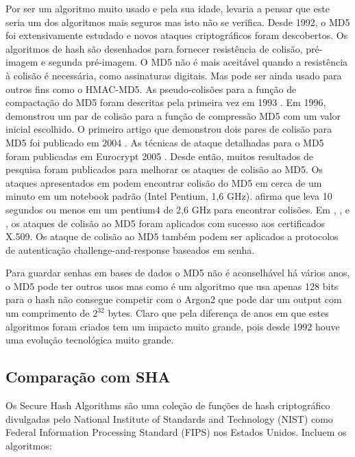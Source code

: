 \documentclass[conference]{IEEEtran}
\begin{document}
Por ser um algoritmo muito usado e pela sua idade, levaria a pensar que 
este seria um dos algoritmos mais seguros mas isto não se verifica.
Desde 1992, o MD5 foi extensivamente estudado e novos ataques criptográficos foram descobertos. 
Os algoritmos de hash são desenhados para fornecer resistência de colisão, pré-imagem e segunda 
pré-imagem. O MD5 não é mais aceitável quando a resistência à colisão é necessária, 
como assinaturas digitais. Mas pode ser ainda usado para outros fins como o HMAC-MD5. 
As pseudo-colisões para a função de compactação do MD5 foram descritas pela primeira vez em 
1993 \cite{BoerCollisions}. Em 1996, \cite{DobbertinCryptanalysis} demonstrou um par de colisão 
para a função de compressão MD5 com um valor inicial escolhido. O primeiro artigo que demonstrou dois 
pares de colisão para MD5 foi publicado em 2004 \cite{Wang2004Collisions}. As técnicas de ataque detalhadas para o MD5 
foram publicadas em Eurocrypt 2005 \cite{WanginproceedingsHow}. Desde então, muitos resultados de pesquisa foram publicados 
para melhorar os ataques de colisão ao MD5. Os ataques apresentados em \cite{Klima2006Tunnels} podem encontrar 
colisão do MD5 em cerca de um minuto em um notebook padrão (Intel Pentium, 1,6 GHz). \cite{Stevens2007Collisions} 
afirma que leva 10 segundos ou menos em um pentium4 de 2,6 GHz para encontrar colisões. 
Em \cite{Stevens2007Collisions}, \cite{Stevens2007Chosen}, \cite{Stevens2009Short} e \cite{Stevens2012Chosen}, os ataques de colisão ao MD5 
foram aplicados com sucesso aos certificados X.509. Os ataque de colisão ao MD5 também podem ser 
aplicados a protocolos de autenticação challenge-and-response baseados em senha. \cite{rfc6151}

Para guardar senhas em bases de dados o MD5 não é aconselhável há vários anos, o MD5 pode 
ter outros usos mas como é um algoritmo que usa apenas 128 bits para o hash não consegue 
competir com o Argon2 que pode dar um output com um comprimento de $2^{32}$ bytes. Claro que 
pela diferença de anos em que estes algoritmos foram criados tem um impacto muito grande, pois 
desde 1992 houve uma evolução tecnológica muito grande.

\subsection{Comparação com SHA}

Os Secure Hash Algorithms são uma coleção de funções de hash criptográfico divulgadas pelo 
National Institute of Standards and Technology (NIST) como Federal Information Processing 
Standard (FIPS) nos Estados Unidos. Incluem os algoritmos: 
\end{document}
